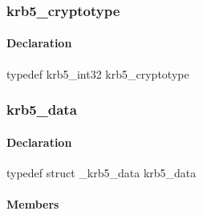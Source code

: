 \documentclass[letterpaper,10pt,english]{sphinxmanual}
\begin{document}

\begin{fulllineitems}
\label{appdev/refs/types/krb5_crypto_iov:krb5_crypto_iov.data}
\end{fulllineitems}



\subsubsection{krb5\_cryptotype}
\label{appdev/refs/types/krb5_cryptotype:krb5-cryptotype}\label{appdev/refs/types/krb5_cryptotype::doc}\label{appdev/refs/types/krb5_cryptotype:krb5-cryptotype-struct}

\begin{fulllineitems}
\label{appdev/refs/types/krb5_cryptotype:krb5_cryptotype}
\end{fulllineitems}



\paragraph{Declaration}
\label{appdev/refs/types/krb5_cryptotype:declaration}
typedef krb5\_int32 krb5\_cryptotype


\subsubsection{krb5\_data}
\label{appdev/refs/types/krb5_data:krb5-data}\label{appdev/refs/types/krb5_data::doc}\label{appdev/refs/types/krb5_data:krb5-data-struct}

\begin{fulllineitems}
\label{appdev/refs/types/krb5_data:krb5_data}
\end{fulllineitems}



\paragraph{Declaration}
\label{appdev/refs/types/krb5_data:declaration}
typedef struct \_krb5\_data  krb5\_data


\paragraph{Members}
\label{appdev/refs/types/krb5_data:members}
\end{document}
